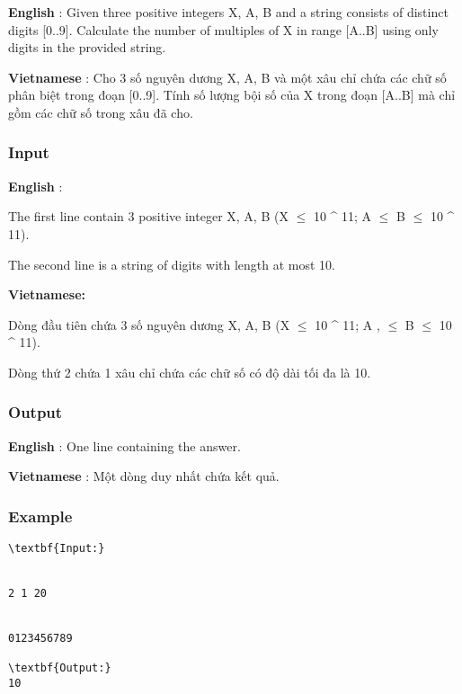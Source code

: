 



\textbf{    English   }   : Given three positive integers X, A, B and a string consists of distinct digits [0..9]. Calculate the number of multiples of X in range [A..B] using only digits in the provided string.  

\textbf{    Vietnamese   }   : Cho 3 số nguyên dương X, A, B và một xâu chỉ chứa các chữ số phân biệt trong đoạn [0..9]. Tính số lượng bội số của X trong đoạn [A..B] mà chỉ gồm các chữ số trong xâu đã cho.  

\subsubsection{   Input  }

\textbf{    English   }   :  

   The first line contain 3 positive integer X, A, B (X  $\le$  10 ^ 11; A  $\le$  B  $\le$  10 ^ 11).  

   The second line is a string of digits with length at most 10.  

\textbf{    Vietnamese:   }

   Dòng đầu tiên chứa 3 số nguyên dương X, A, B (X  $\le$  10 ^ 11; A , $\le$  B  $\le$  10 ^ 11).  

   Dòng thứ 2 chứa 1 xâu chỉ chứa các chữ số có độ dài tối đa là 10.  

\subsubsection{   Output  }

\textbf{    English   }   : One line containing the answer.  

\textbf{    Vietnamese   }   : Một dòng duy nhất chứa kết quả.  

\subsubsection{   Example  }
\begin{verbatim}
\textbf{Input:}


2 1 20


0123456789

\textbf{Output:}
10








\end{verbatim}
